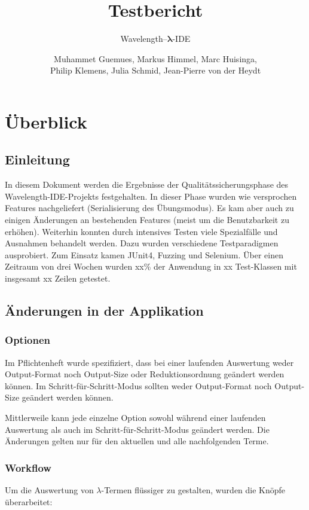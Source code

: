 \documentclass[parskip=full,11pt,openany]{scrreprt}
\title{Testbericht}
\subtitle{Wavelength--$\bm{\lambda}$-IDE}
\author{Muhammet Guemues, Markus Himmel, Marc Huisinga,\\Philip Klemens, Julia Schmid, Jean-Pierre von der Heydt}
\begin{document}
\maketitle
\newpage
\tableofcontents
\newpage

\chapter{Überblick}

\section{Einleitung}
In diesem Dokument werden die Ergebnisse der Qualitätssicherungsphase des Wavelength-IDE-Projekts festgehalten.
In dieser Phase wurden wie versprochen Features nachgeliefert (Serialisierung des Übungsmodus).
Es kam aber auch zu einigen Änderungen an bestehenden Features (meist um die Benutzbarkeit zu erhöhen).
Weiterhin konnten durch intensives Testen viele Spezialfälle und Ausnahmen behandelt werden.
Dazu wurden verschiedene Testparadigmen ausprobiert.
Zum Einsatz kamen JUnit4, Fuzzing und Selenium.
Über einen Zeitraum von drei Wochen wurden xx\% der Anwendung in xx Test-Klassen mit insgesamt xx Zeilen getestet.

\section{Änderungen in der Applikation}
\subsection{Optionen}
Im Pflichtenheft wurde spezifiziert, dass bei einer laufenden Auswertung weder Output-Format noch Output-Size
oder Reduktionsordnung geändert werden können. Im Schritt-für-Schritt-Modus sollten weder Output-Format noch
Output-Size geändert werden können. 

Mittlerweile kann jede einzelne Option sowohl während einer laufenden Auswertung als auch im Schritt-für-Schritt-Modus
geändert werden. Die Änderungen gelten nur für den aktuellen und alle nachfolgenden Terme.

\subsection{Workflow}\label{changeWorkflow}
Um die Auswertung von $\lambda$-Termen flüssiger zu gestalten, wurden die Knöpfe überarbeitet:
\end{document}
